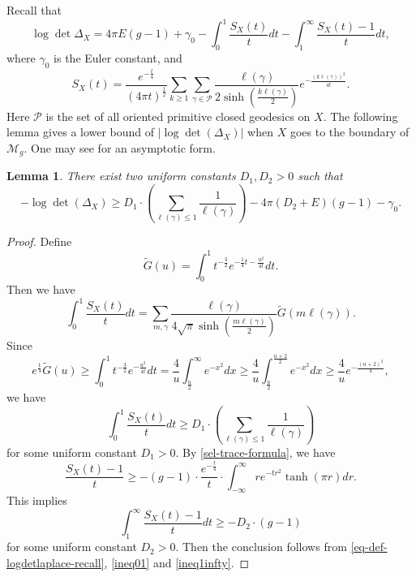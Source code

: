 \documentclass[11pt]{amsart}
\newcommand{\M}{\mathcal{M}}
\theoremstyle{plain}
\newtheorem{lemma}[theorem]{Lemma}
\theoremstyle{definition}
\theoremstyle{remark}
\begin{document}
Recall that
\begin{equation}\label{eq-def-logdetlaplace-recall}
\log \det\Delta_X=4\pi E (g-1)+\gamma_0-\int_{0}^1\frac{S_X(t)}{t}dt-\int_1^\infty\frac{S_X(t)-1}{t}dt,
\end{equation}
where $\gamma_0$ is the Euler constant, and $$S_X(t)=\frac{e^{-\frac{t}{4}}}{(4\pi t)^\frac{1}{2}}\sum_{k\geq 1}\sum_{\gamma\in \mathcal{P}} \frac{\ell(\gamma)}{2\sinh\left(\frac{k\ell(\gamma)}{2}\right)}e^{-\frac{(k\ell(\gamma))^2}{4t}}.$$ Here $\mathcal{P}$ is the set of all oriented primitive closed geodesics on $X$. The following lemma gives a lower bound of $\left|  \log\det(\Delta_X) \right|$ when $X$ goes to the boundary of $\M_g$.  One may see \cite{Wol87} for an asymptotic form.
\begin{lemma}\label{lowbound}
There exist two uniform constants $D_1, D_2>0$ such that 
$$
-\log \det (\Delta_X)\geq D_1\cdot \left( \sum\limits_{\ell(\gamma)\leq 1}\frac{1}{\ell(\gamma)}\right)-4\pi(D_2+E)(g-1)-\gamma_0.
$$    
\end{lemma}
\begin{proof}
Define  $$
 \tilde{G}(u)=\int_0^1t^{-\frac{3}{2}}e^{-\frac{1}{4}t-\frac{u^2}{4t}}dt.$$
Then we have $$
\int_0^1 \frac{S_X(t)}{t}dt=\sum\limits_{m,\gamma}\frac{\ell(\gamma)}{4\sqrt{\pi}\sinh(\frac{m\ell(\gamma)}{2})}\tilde{G}(m\ell(\gamma)).
$$
Since $$e^{\frac{1}{4}}\tilde{G}(u)\geq \int_0^1t^{-\frac{3}{2}}e^{-\frac{u^2}{4t}}dt=\frac{4}{u}\int_{\frac{u}{2}}^\infty e^{-x^2}dx\geq \frac{4}{u}\int_{\frac{u}{2}}^{\frac{u+2}{2}} e^{-x^2}dx
\geq \frac{4}{u}e^{-\frac{(u+2)^2}{4}},
$$
we have  \begin{equation}\label{ineq01}
    \int_0^1 \frac{S_X(t)}{t}dt\geq D_1\cdot \left( \sum\limits_{\ell(\gamma)\leq 1}\frac{1}{\ell(\gamma)}\right)
\end{equation}
for some uniform constant $D_1>0$.
By \eqref{sel-trace-formula}, we have 
\[ \frac{S_X(t)-1}{t}\geq -(g-1)\cdot \frac{e^{-\frac{t}{4}}}{t} \cdot \int_{-\infty}^{\infty}re^{-tr^2}\tanh(\pi r)dr.\]
This implies
\begin{equation}\label{ineq1infty}
    \int_1^\infty \frac{S_X(t)-1}{t}dt\geq - D_2 \cdot (g-1)
\end{equation} for some uniform  constant $D_2>0$.
    Then the conclusion follows from \eqref{eq-def-logdetlaplace-recall},  \eqref{ineq01} and \eqref{ineq1infty}.
\end{proof}
\end{document}
